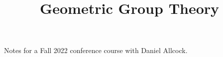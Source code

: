 \documentclass[fontsize=9pt]{article}
\title{Geometric Group Theory}
\begin{document}
\maketitle
Notes for a Fall 2022 conference course with Daniel Allcock. 
\tableofcontents
\newpage
     
     
     
\clearpage
\printbibliography
\end{document}
